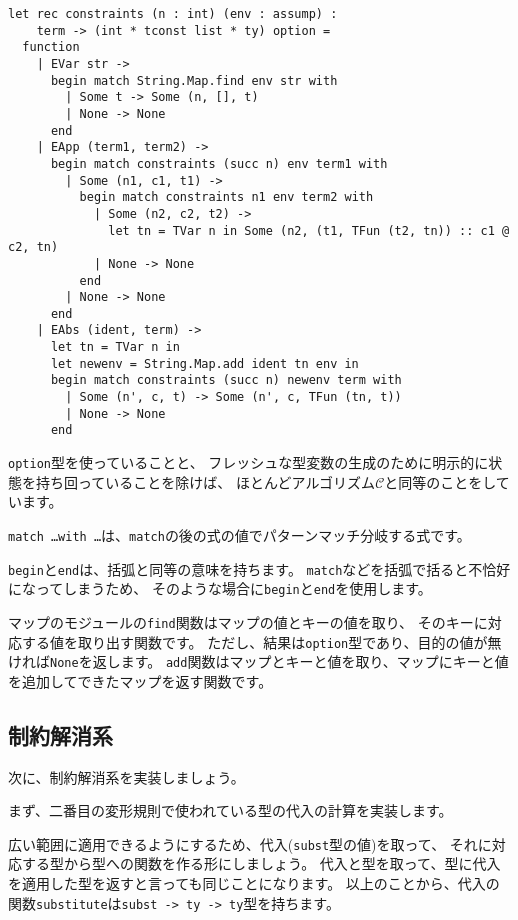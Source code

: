 \begin{lstlisting}[caption=方程式の生成, label=list:ocaml-stlc-constraints]
let rec constraints (n : int) (env : assump) :
    term -> (int * tconst list * ty) option =
  function
    | EVar str ->
      begin match String.Map.find env str with
        | Some t -> Some (n, [], t)
        | None -> None
      end
    | EApp (term1, term2) ->
      begin match constraints (succ n) env term1 with
        | Some (n1, c1, t1) ->
          begin match constraints n1 env term2 with
            | Some (n2, c2, t2) ->
              let tn = TVar n in Some (n2, (t1, TFun (t2, tn)) :: c1 @ c2, tn)
            | None -> None
          end
        | None -> None
      end
    | EAbs (ident, term) ->
      let tn = TVar n in
      let newenv = String.Map.add ident tn env in
      begin match constraints (succ n) newenv term with
        | Some (n', c, t) -> Some (n', c, TFun (tn, t))
        | None -> None
      end
\end{lstlisting}

\texttt{option}型を使っていることと、
フレッシュな型変数の生成のために明示的に状態を持ち回っていることを除けば、
ほとんどアルゴリズム$\mathcal C$と同等のことをしています。

\texttt{match \dots with \dots}は、\texttt{match}の後の式の値でパターンマッチ分岐する式です。

\texttt{begin}と\texttt{end}は、括弧と同等の意味を持ちます。
\texttt{match}などを括弧で括ると不恰好になってしまうため、
そのような場合に\texttt{begin}と\texttt{end}を使用します。

マップのモジュールの\texttt{find}関数はマップの値とキーの値を取り、
そのキーに対応する値を取り出す関数です。
ただし、結果は\texttt{option}型であり、目的の値が無ければ\texttt{None}を返します。
\texttt{add}関数はマップとキーと値を取り、マップにキーと値を追加してできたマップを返す関数です。

\subsection{制約解消系}

次に、制約解消系を実装しましょう。

まず、二番目の変形規則で使われている型の代入の計算を実装します。

広い範囲に適用できるようにするため、代入(\texttt{subst}型の値)を取って、
それに対応する型から型への関数を作る形にしましょう。
代入と型を取って、型に代入を適用した型を返すと言っても同じことになります。
以上のことから、代入の関数\texttt{substitute}は\texttt{subst -> ty -> ty}型を持ちます。


